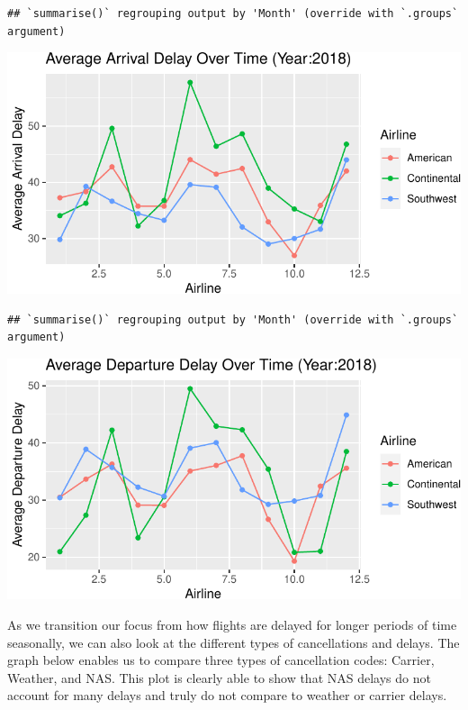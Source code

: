 \documentclass[
]{article}
\begin{document}
\begin{verbatim}
## `summarise()` regrouping output by 'Month' (override with `.groups` argument)
\end{verbatim}

\begin{center}\includegraphics{STA380Exercises_Ofunrein_Pflum_Robinson_Vincent_files/figure-latex/unnamed-chunk-9-1} \end{center}

\begin{verbatim}
## `summarise()` regrouping output by 'Month' (override with `.groups` argument)
\end{verbatim}

\begin{center}\includegraphics{STA380Exercises_Ofunrein_Pflum_Robinson_Vincent_files/figure-latex/unnamed-chunk-9-2} \end{center}

As we transition our focus from how flights are delayed for longer
periods of time seasonally, we can also look at the different types of
cancellations and delays. The graph below enables us to compare three
types of cancellation codes: Carrier, Weather, and NAS. This plot is
clearly able to show that NAS delays do not account for many delays and
truly do not compare to weather or carrier delays.
\end{document}
